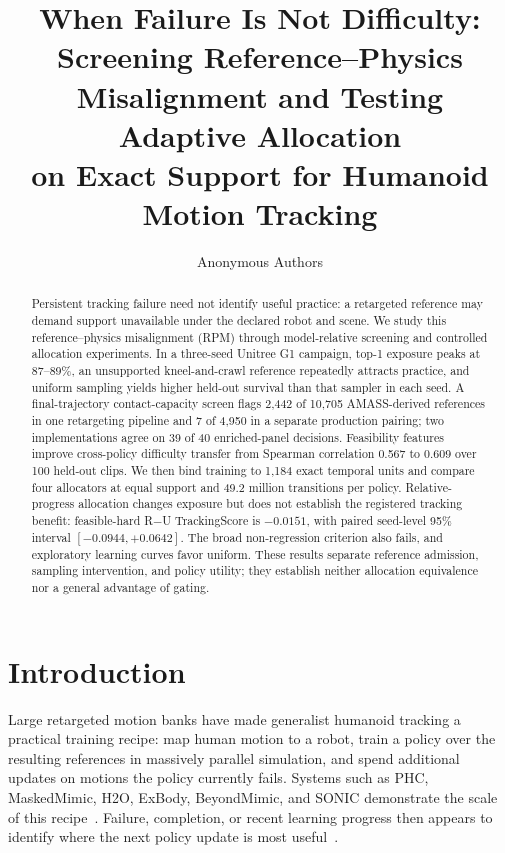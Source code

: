 \documentclass[letterpaper,10pt,conference]{ieeeconf}
\title{\LARGE \bf
When Failure Is Not Difficulty:\\
Screening Reference--Physics Misalignment and Testing Adaptive Allocation\\
on Exact Support for Humanoid Motion Tracking
}
\author{Anonymous Authors}
\begin{document}
\maketitle
\thispagestyle{empty}
\pagestyle{empty}

\begin{abstract}
Persistent tracking failure need not identify useful practice: a retargeted reference may
demand support unavailable under the declared robot and scene. We study this
reference--physics misalignment (RPM) through model-relative screening and controlled
allocation experiments. In a three-seed Unitree G1 campaign, top-1 exposure peaks at
87--89\%, an unsupported kneel-and-crawl reference repeatedly attracts practice, and
uniform sampling yields higher held-out survival than that sampler in each seed. A final-trajectory
contact-capacity screen flags 2,442 of 10,705 AMASS-derived references in one retargeting
pipeline and 7 of 4,950 in a separate production pairing; two implementations agree on
39 of 40 enriched-panel decisions. Feasibility features improve cross-policy difficulty
transfer from Spearman correlation 0.567 to 0.609 over 100 held-out clips. We then bind
training to 1,184 exact temporal units and compare four allocators at equal support and
49.2 million transitions per policy. Relative-progress allocation changes exposure but
does not establish the registered tracking benefit: feasible-hard R$-$U TrackingScore
is $-0.0151$, with paired seed-level 95\% interval $[-0.0944,+0.0642]$. The broad
non-regression criterion also fails, and exploratory learning curves favor uniform.
These results separate reference admission, sampling intervention, and policy utility;
they establish neither allocation equivalence nor a general advantage of gating.
\end{abstract}

\section{Introduction}

Large retargeted motion banks have made generalist humanoid tracking a practical training recipe:
map human motion to a robot, train a policy over the resulting references in massively parallel
simulation, and spend additional updates on motions the policy currently fails. Systems such as
PHC, MaskedMimic, H2O, ExBody, BeyondMimic, and SONIC demonstrate the scale of this
recipe~\cite{luo2023phc,tessler2024maskedmimic,he2024h2o,cheng2024exbody,liao2025beyondmimic,luo2025sonic}.
Failure, completion, or recent learning progress then appears to identify where the next policy
update is most useful~\cite{liao2025beyondmimic,chen2025gmt,yang2025egm}.
\end{document}
